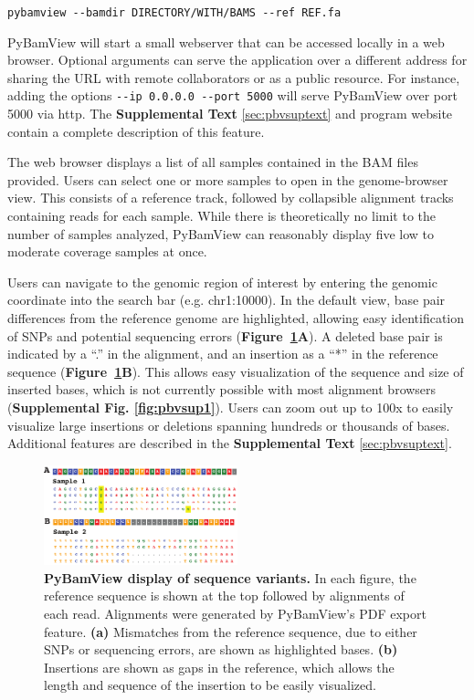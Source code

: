 \texttt{pybamview -{}-bamdir DIRECTORY/WITH/BAMS -{}-ref REF.fa}

PyBamView will start a small webserver that can be accessed locally in a web browser. Optional arguments can serve the application over a different address for sharing the URL with remote collaborators or as a public resource. For instance, adding the options 
\texttt{-{}-ip 0.0.0.0 -{}-port 5000} will serve PyBamView over port 5000 via http. The \textbf{Supplemental Text} \ref{sec:pbvsuptext} and program website contain a complete description of this feature.

The web browser displays a list of all samples contained in the BAM files provided. Users can select one or more samples to open in the genome-browser view. This consists of a reference track, followed by collapsible alignment tracks containing reads for each sample. While there is theoretically no limit to the number of samples analyzed, PyBamView can reasonably display five low to moderate coverage samples at once.

Users can navigate to the genomic region of interest by entering the genomic coordinate into the search bar (e.g. chr1:10000). In the default view, base pair differences from the reference genome are highlighted, allowing easy identification of SNPs and potential sequencing errors (\textbf{Figure~\ref{fig:pbvfig1}A}). A deleted base pair is indicated by a ``.'' in the alignment, and an insertion as a ``*'' in the reference sequence (\textbf{Figure~\ref{fig:pbvfig1}B}). This allows easy visualization of the sequence and size of inserted bases, which is not currently possible with most alignment browsers (\textbf{Supplemental Fig. \ref{fig:pbvsup1}}). Users can zoom out up to 100x to easily visualize large insertions or deletions spanning hundreds or thousands of bases. Additional features are described in the \textbf{Supplemental Text} \ref{sec:pbvsuptext}.

\begin{figure}[!h]
\centering
\label{fig:pbvfig1}
\includegraphics[width=0.5\textwidth]{Figures/App2/Fig1.pdf}
\caption{\textbf{PyBamView display of sequence variants.} In each figure, the reference sequence is shown at the top followed by alignments of each read. Alignments were generated by PyBamView's PDF export feature. \textbf{(a)} Mismatches from the reference sequence, due to either SNPs or sequencing errors, are shown as highlighted bases. \textbf{(b)} Insertions are shown as gaps in the reference, which allows the length and sequence of the insertion to be easily visualized.}
\end{figure}

